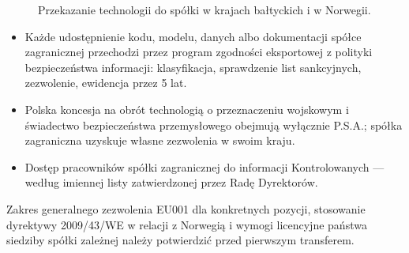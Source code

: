 \documentclass[11pt,a4paper]{report}
\begin{document}
\begin{figure}[H]
\centering
{}
\caption{Przekazanie technologii do spółki w krajach bałtyckich i w Norwegii.}
\end{figure}

\begin{itemize}
  \item Każde udostępnienie kodu, modelu, danych albo dokumentacji spółce zagranicznej przechodzi przez program zgodności eksportowej z polityki bezpieczeństwa informacji: klasyfikacja, sprawdzenie list sankcyjnych, zezwolenie, ewidencja przez 5 lat.
  \item Polska koncesja na obrót technologią o przeznaczeniu wojskowym i świadectwo bezpieczeństwa przemysłowego obejmują wyłącznie P.S.A.; spółka zagraniczna uzyskuje własne zezwolenia w swoim kraju.
  \item Dostęp pracowników spółki zagranicznej do informacji Kontrolowanych --- według imiennej listy zatwierdzonej przez Radę Dyrektorów.
\end{itemize}

\begin{Weryfikacja}
Zakres generalnego zezwolenia EU001 dla konkretnych pozycji, stosowanie dyrektywy 2009/43/WE w relacji z Norwegią i wymogi licencyjne państwa siedziby spółki zależnej należy potwierdzić przed pierwszym transferem.
\end{Weryfikacja}

\end{document}
